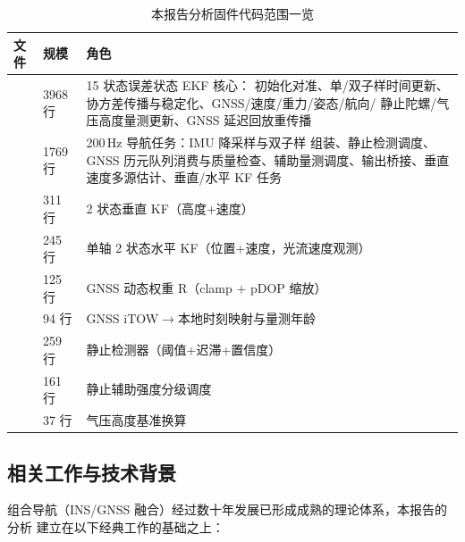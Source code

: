 \begin{table}[H]
\centering
\caption{本报告分析固件代码范围一览}
\label{tab:code-scope}
\small
\begin{tabularx}{\textwidth}{@{}L{5.2cm}L{2.6cm}X@{}}
\toprule
\textbf{文件} & \textbf{规模} & \textbf{角色} \\
\midrule
{} & 3968 行 & 15 状态误差状态 EKF 核心：
  初始化对准、单/双子样时间更新、协方差传播与稳定化、GNSS/速度/重力/姿态/航向/
  静止陀螺/气压高度量测更新、GNSS 延迟回放重传播 \\
 & 1769 行 & 200\,Hz 导航任务：IMU 降采样与双子样
  组装、静止检测调度、GNSS 历元队列消费与质量检查、辅助量测调度、输出桥接、垂直
  速度多源估计、垂直/水平 KF 任务 \\
 & 311 行 & 2 状态垂直 KF（高度+速度）\\
 & 245 行 & 单轴 2 状态水平 KF（位置+速度，光流速度观测）\\
 & 125 行 & GNSS 动态权重 R（clamp + pDOP 缩放）\\
 & 94 行 & GNSS iTOW$\rightarrow$本地时刻映射与量测年龄 \\
 & 259 行 & 静止检测器（阈值+迟滞+置信度）\\
 & 161 行 & 静止辅助强度分级调度 \\
 & 37 行 & 气压高度基准换算 \\
\bottomrule
\end{tabularx}
\end{table}

\subsection{相关工作与技术背景}

组合导航（INS/GNSS 融合）经过数十年发展已形成成熟的理论体系，本报告的分析
建立在以下经典工作的基础之上：

